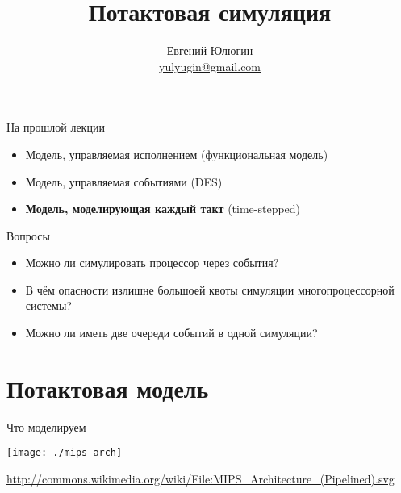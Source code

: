 
\title{Потактовая симуляция}
\author[Евгений Юлюгин]{Евгений Юлюгин \\ \small{\href{mailto:yulyugin@gmail.com}{yulyugin@gmail.com}}}



\begin{frame}
    \maketitle
\end{frame}

\begin{frame}
    \tableofcontents
\end{frame}

\begin{frame}{На прошлой лекции}
\begin{itemize}
    \item Модель, управляемая исполнением (функциональная модель)
    \item Модель, управляемая событиями (DES)\pause
    \item \textbf{Модель, моделирующая каждый такт} (time-stepped)
\end{itemize}
\end{frame}

\begin{frame}{Вопросы}
\begin{itemize}
\item Можно ли симулировать процессор через события?\pause
\item В чём опасности излишне большоей квоты симуляции многопроцессорной системы?\pause
\item Можно ли иметь две очереди событий в одной симуляции?
\end{itemize}

\end{frame}

\section{Потактовая модель}

\begin{frame}{Что моделируем}
\centering

\texttt{[image: ./mips-arch]}

\tiny{\url{http://commons.wikimedia.org/wiki/File:MIPS_Architecture_(Pipelined).svg}}
\end{frame}

